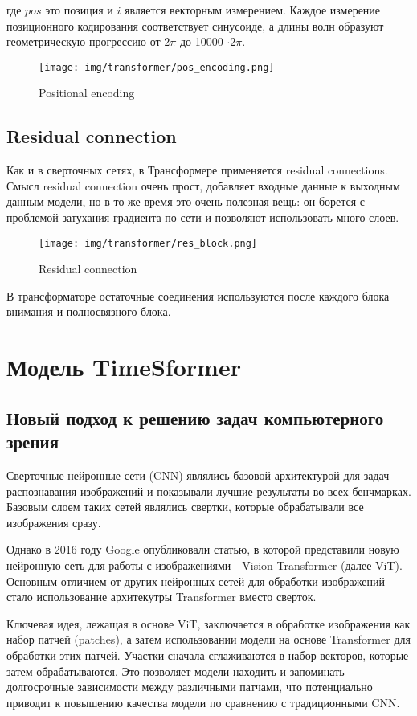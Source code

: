 \documentclass[PMI,VKR]{HSEUniversity}
\begin{document}
где $pos$ это позиция и $i$ является векторным измерением. Каждое измерение позиционного кодирования соответствует синусоиде, а длины волн образуют геометрическую прогрессию от $2\pi$ до 10000 $\cdot 2\pi$.

\begin{figure}[h]
    \centering
    \texttt{[image: img/transformer/pos\_encoding.png]}
    \caption{Positional encoding}
\end{figure} 


\subsection{Residual connection} 

Как и в сверточных сетях, в Трансформере применяется residual connections. Смысл residual connection очень прост, добавляет входные данные к выходным данным модели, но в то же время это очень полезная вещь: он борется с проблемой затухания градиента по сети и позволяют использовать много слоев.

\begin{figure}[h]
    \centering
    \texttt{[image: img/transformer/res\_block.png]}
    \caption{Residual connection}
\end{figure}

В трансформаторе остаточные соединения используются после каждого блока внимания и полносвязного блока.

\section{Модель TimeSformer}
\subsection{Новый подход к решению задач компьютерного зрения}

Сверточные нейронные сети (CNN) являлись базовой архитектурой для задач распознавания изображений и показывали лучшие результаты во всех бенчмарках. Базовым слоем таких сетей являлись свертки, которые обрабатывали все изображения сразу.  

Однако в 2016 году Google опубликовали статью, в которой представили новую нейронную сеть для работы с изображениями - Vision Transformer\cite{vit:2016} (далее ViT). Основным отличием от других нейронных сетей для обработки изображений стало использование архитекутры Transformer вместо сверток.

Ключевая идея, лежащая в основе ViT, заключается в обработке изображения как набор патчей (patches), а затем использовании модели на основе Transformer для обработки этих патчей. Участки сначала сглаживаются в набор векторов, которые затем обрабатываются. Это позволяет модели находить и запоминать долгосрочные зависимости между различными патчами, что потенциально приводит к повышению качества модели по сравнению с традиционными CNN.
\end{document}

